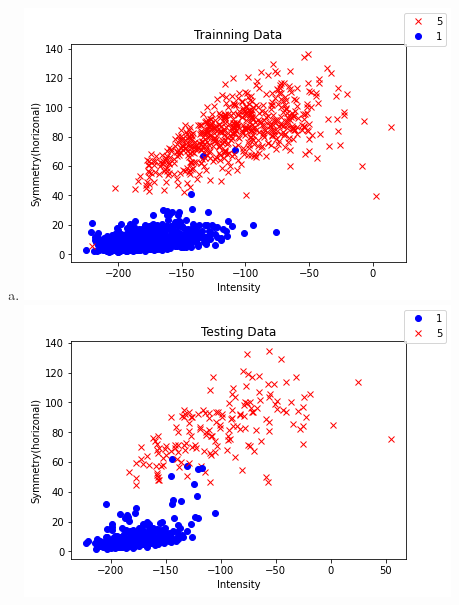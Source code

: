 \documentclass{article}
\begin{document}
\begin{enumerate}[a)]
    \item \includegraphics[]{images/hand/3} \\ \includegraphics[]{images/hand/4}
\end{enumerate}
\end{document}
